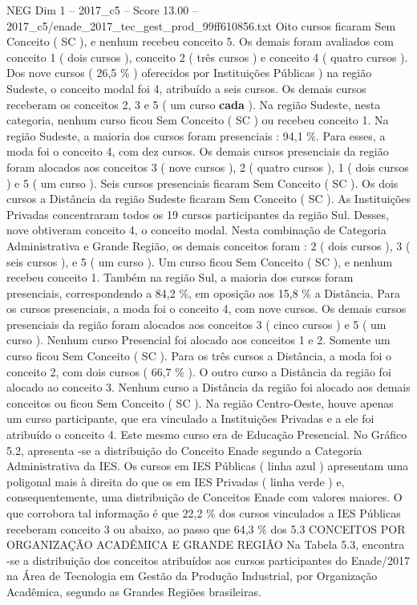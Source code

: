 \begin{textsample}{NEG Dim 1 – 2017\_c5 – Score 13.00 – 2017\_c5/enade\_2017\_tec\_gest\_prod\_99ff610856.txt}
Oito cursos ficaram Sem Conceito ( SC ), e nenhum recebeu conceito 5.
Os demais foram avaliados com conceito 1 ( dois cursos ), conceito 2 ( três cursos ) e conceito 4 ( quatro cursos ).
Dos nove cursos ( 26,5 \% ) oferecidos por Instituições Públicas ) na região Sudeste, o conceito modal foi 4, atribuído a seis cursos.
Os demais cursos receberam os conceitos 2, 3 e 5 ( um curso \textbf{cada} ).
Na região Sudeste, nesta categoria, nenhum curso ficou Sem Conceito ( SC ) ou recebeu conceito 1.
Na região Sudeste, a maioria dos cursos foram presenciais : 94,1 \%.
Para esses, a moda foi o conceito 4, com dez cursos.
Os demais cursos presenciais da região foram alocados aos conceitos 3 ( nove cursos ), 2 ( quatro cursos ), 1 ( dois cursos ) e 5 ( um curso ).
Seis cursos presenciais ficaram Sem Conceito ( SC ).
Os dois cursos a Distância da região Sudeste ficaram Sem Conceito ( SC ).
As Instituições Privadas concentraram todos os 19 cursos participantes da região Sul.
Desses, nove obtiveram conceito 4, o conceito modal.
Nesta combinação de Categoria Administrativa e Grande Região, os demais conceitos foram : 2 ( dois cursos ), 3 ( seis cursos ), e 5 ( um curso ).
Um curso ficou Sem Conceito ( SC ), e nenhum recebeu conceito 1.
Também na região Sul, a maioria dos cursos foram presenciais, correspondendo a 84,2 \%, em oposição aos 15,8 \% a Distância.
Para os cursos presenciais, a moda foi o conceito 4, com nove cursos.
Os demais cursos presenciais da região foram alocados aos conceitos 3 ( cinco cursos ) e 5 ( um curso ).
Nenhum curso Presencial foi alocado aos conceitos 1 e 2.
Somente um curso ficou Sem Conceito ( SC ).
Para os três cursos a Distância, a moda foi o conceito 2, com dois cursos ( 66,7 \% ).
O outro curso a Distância da região foi alocado ao conceito 3.
Nenhum curso a Distância da região foi alocado aos demais conceitos ou ficou Sem Conceito ( SC ).
Na região Centro-Oeste, houve apenas um curso participante, que era vinculado a Instituições Privadas e a ele foi atribuído o conceito 4.
Este mesmo curso era de Educação Presencial.
No Gráfico 5.2, apresenta -se a distribuição do Conceito Enade segundo a Categoria Administrativa da IES.
Os cursos em IES Públicas ( linha azul ) apresentam uma poligonal mais à direita do que os em IES Privadas ( linha verde ) e, consequentemente, uma distribuição de Conceitos Enade com valores maiores.
O que corrobora tal informação é que 22,2 \% dos cursos vinculados a IES Públicas receberam conceito 3 ou abaixo, ao passo que 64,3 \% dos 5.3 CONCEITOS POR ORGANIZAÇÃO ACADÊMICA E GRANDE REGIÃO Na Tabela 5.3, encontra -se a distribuição dos conceitos atribuídos aos cursos participantes do Enade/2017 na Área de Tecnologia em Gestão da Produção Industrial, por Organização Acadêmica, segundo as Grandes Regiões brasileiras.

\end{textsample}
